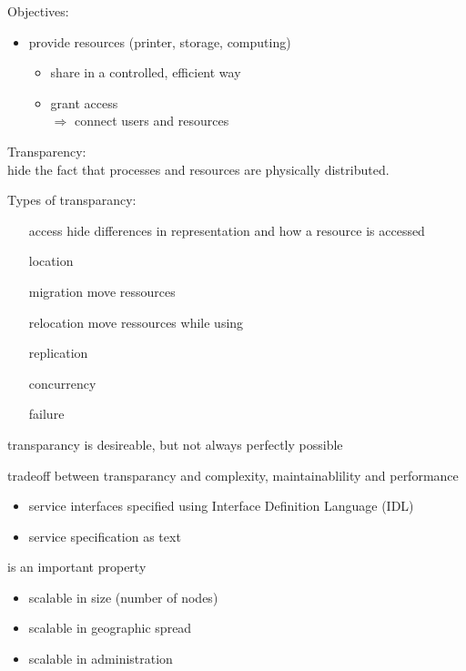 \documentclass[ngerman,a4paper]{report}
\begin{document}
Objectives:\\
\begin{itemize}
\item provide resources (printer, storage, computing)
\begin{itemize}
\item share in a controlled, efficient way
\item grant access\\
$\Rightarrow$ connect users and resources
\end{itemize}

\end{itemize}

Transparency:\\
hide the fact that processes and resources are physically distributed.

Types of transparancy:\\
\begin{itemize}
\item[access] hide differences in representation and how a resource is accessed
\item[location]
\item[migration] move ressources
\item[relocation] move ressources while using
\item[replication]
\item[concurrency]
\item[failure]
\end{itemize}

transparancy is desireable, but not always perfectly possible

tradeoff between transparancy and complexity, maintainablility and performance


\begin{itemize}
\item service interfaces specified using Interface Definition Language (IDL)
\item service specification as text
\end{itemize}

 is an important property

\begin{itemize}
\item scalable in size (number of nodes)
\item scalable in geographic spread
\item scalable in administration
\end{itemize}
\end{document}
